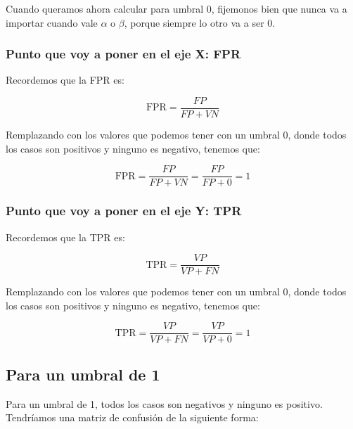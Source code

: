 \documentclass[12pt]{article}
\begin{document}
Cuando queramos ahora calcular para umbral 0, fijemonos bien que nunca va a importar cuando vale $\alpha$ o $\beta$, porque siempre lo otro va a ser 0.

\subsubsection{Punto que voy a poner en el eje X: FPR}

Recordemos que la FPR es:

\[
\text{FPR} = \frac{FP}{FP + VN}
\]

\vspace{0.3em}

Remplazando con los valores que podemos tener con un umbral 0, donde todos los casos son positivos y ninguno es negativo, tenemos que:

\[
\text{FPR} = \frac{FP}{FP + VN} = \frac{FP}{FP + 0} = 1
\]

\subsubsection{Punto que voy a poner en el eje Y: TPR}

Recordemos que la TPR es:

\[
\text{TPR} = \frac{VP}{VP + FN}
\]

\vspace{0.3em}

Remplazando con los valores que podemos tener con un umbral 0, donde todos los casos son positivos y ninguno es negativo, tenemos que:

\[
\text{TPR} = \frac{VP}{VP + FN} = \frac{VP}{VP + 0} = 1
\]

\subsection{Para un umbral de 1}

Para un umbral de 1, todos los casos son negativos y ninguno es positivo. Tendríamos una matriz de confusión de la siguiente forma:

\begin{center}

\end{center}
\end{document}

